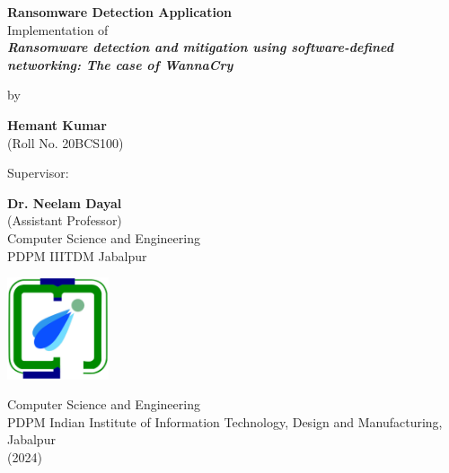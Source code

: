 \documentclass[12pt,twocolumn]{article}
\begin{document}
\begin{titlepage}
    \begin{center}
        \vspace*{1cm}
        
        \textbf{\LARGE Ransomware Detection Application} \\
        \Large{Implementation of \\ \textbf{\textit{Ransomware detection and mitigation using software-defined networking: The case of WannaCry}}}
        
        \vspace{0.6cm}
        
        \Large by
        
        \textbf{\Large Hemant Kumar} \\
        (Roll No. 20BCS100)
        
        \vspace{1cm}
        
        \Large Supervisor:
        
        \textbf{\Large Dr. Neelam Dayal }\\
            (Assistant Professor) \\
        Computer Science and Engineering \\
        PDPM IIITDM Jabalpur
        
        \vspace{1cm}
        
        
        
        \vfill
        
        \includegraphics[width=30mm]{images/logo_college copy.png}
        
        \vspace{0.5cm}
        
        \Large{Computer Science and Engineering 
        \\ PDPM Indian Institute of Information Technology, Design and Manufacturing, Jabalpur}
        \\ (2024)
        
    \end{center}
\end{titlepage}
\end{document}
